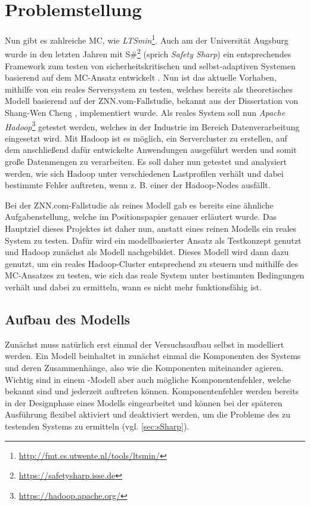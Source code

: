 \section{Problemstellung}\label{sec:problemstellung}

Nun gibt es zahlreiche MC, wie \zB \emph{LTSmin}\footnote{\url{http://fmt.cs.utwente.nl/tools/ltsmin/}}. Auch am \isse der Universität Augsburg wurde in den letzten Jahren mit S\#\footnote{\url{https://safetysharp.isse.de}} (sprich \emph{Safety Sharp}) ein entsprechendes Framework zum testen von sicherheitskritischen und selbst-adaptiven Systemen basierend auf dem MC-Ansatz entwickelt \cite{Habermaier2015,Habermaier2016}. Nun ist das aktuelle Vorhaben, mithilfe von \sS ein reales Serversystem zu testen, welches bereits als theoretisches Modell basierend auf der ZNN.vom-Fallstudie, bekannt aus der Dissertation von Shang-Wen Cheng \cite{Cheng2008}, implementiert wurde. Als reales System soll nun \emph{Apache Hadoop}\footnote{\url{https://hadoop.apache.org/}} getestet werden, welches in der Industrie im Bereich Datenverarbeitung eingesetzt wird. Mit Hadoop ist es möglich, ein Servercluster zu erstellen, auf dem anschließend dafür entwickelte Anwendungen ausgeführt werden und somit große Datenmengen zu verarbeiten. Es soll daher nun getestet und analysiert werden, wie sich Hadoop unter verschiedenen Lastprofilen verhält und dabei bestimmte Fehler auftreten, wenn z. B. einer der Hadoop-Nodes ausfällt.

Bei der ZNN.com-Fallstudie als reines Modell gab es bereits eine ähnliche Aufgabenstellung, welche im Positionspapier \cite{Eberhardinger2017} genauer erläutert wurde. Das Hauptziel dieses Projektes ist daher nun, anstatt eines reinen Modells ein reales System zu testen. Dafür wird ein modellbasierter Ansatz als Testkonzept genutzt und Hadoop zunächst als Modell nachgebildet. Dieses Modell wird dann dazu genutzt, um ein reales Hadoop-Cluster entsprechend zu steuern und mithilfe des MC-Ansatzes zu testen, wie sich das reale System unter bestimmten Bedingungen verhält und dabei zu ermitteln, wann es nicht mehr funktionsfähig ist.

\subsection{Aufbau des Modells}\label{sec:modellaufbau}

Zunächst muss natürlich erst einmal der Versuchsaufbau selbst in \sS modelliert werden. Ein Modell beinhaltet in \sS zunächst einmal die Komponenten des Systems und deren Zusammenhänge, also wie die Komponenten miteinander agieren. Wichtig sind in einem \sS-Modell aber auch mögliche Komponentenfehler, welche bekannt sind und jederzeit auftreten können. Komponentenfehler werden bereits in der Designphase eines Modells eingearbeitet und können bei der späteren Ausführung flexibel aktiviert und deaktiviert werden, um die Probleme des zu testenden Systems zu ermitteln (vgl. \autoref{sec:sSharp}).

